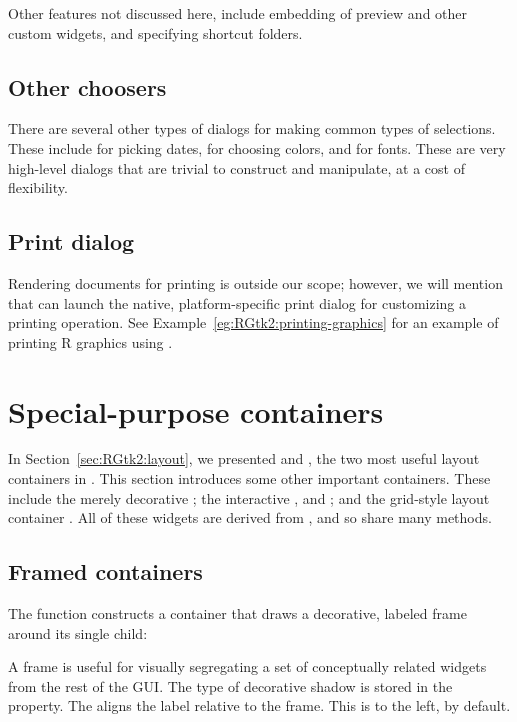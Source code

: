 Other features not discussed here, include embedding of preview and
other custom widgets, and specifying shortcut folders.

\subsection{Other choosers}

There are several other types of dialogs for making common types of
selections. These include  for picking dates,
 for choosing colors, and
 for fonts. These are very high-level
dialogs that are trivial to construct and manipulate, at a cost of
flexibility.

\subsection{Print dialog}

Rendering documents for printing is outside our scope; however, we
will mention that  can launch the native,
platform-specific print dialog for customizing a printing
operation. See Example~\ref{eg:RGtk2:printing-graphics} for an example
of printing R graphics using .


\section{Special-purpose containers}
\label{sec:RGtk2:containers}

In Section~\ref{sec:RGtk2:layout}, we presented  and
, the two most useful layout containers in
\GTK. This section introduces some other important containers. These
include the merely decorative ; the interactive
,  and ; and the
grid-style layout container . All of these widgets are
derived from , and so share many methods.

\subsection{Framed containers}
\label{sec:RGtk2:gtkFrame}

The  function constructs a container that draws
a decorative, labeled frame around its single child:
\begin{Schunk}
\end{Schunk}
%
A frame is useful for visually segregating a set of conceptually
related widgets from the rest of the GUI. The type of decorative
shadow is stored in the  property.  The
 aligns the label relative to the
frame. This is to the left, by default.

